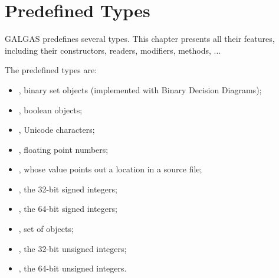 \chapter{Predefined Types} \label{predefinedTypes}

GALGAS predefines several types. This chapter presents all their features, including their constructors, readers, modifiers, methods, ...


\begin{description}
\item The predefined types are:
\begin{itemize}
\item {}, binary set objects (implemented with Binary Decision Diagrams);
\item {}, boolean objects;
\item {}, Unicode characters;
\item {}, floating point numbers;
\item {}, whose value points out a location in a source file;
\item {}, the 32-bit signed integers;
\item {}, the 64-bit signed integers;
\item {}, set of  objects;
\item {}, the 32-bit unsigned integers;
\item {}, the 64-bit unsigned integers.
\end{itemize}
\end{description}













